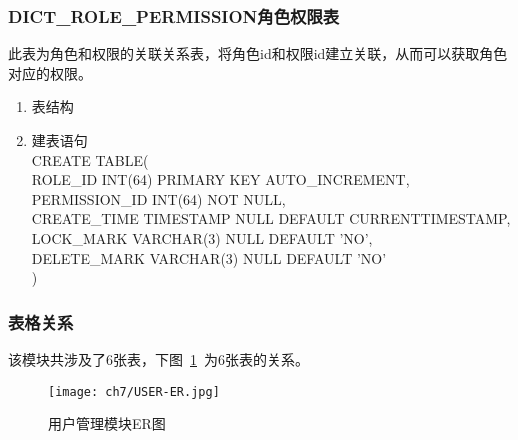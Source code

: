 \subsubsection{DICT\_ROLE\_PERMISSION角色权限表}
此表为角色和权限的关联关系表，将角色id和权限id建立关联，从而可以获取角色对应的权限。
\begin{enumerate}
    \item 表结构
    \begin{table}[htbp]
        \centering
        \end{table}
    \item 建表语句\\
        CREATE TABLE(\\
            ROLE\_ID INT(64) PRIMARY KEY AUTO\_INCREMENT,\\
            PERMISSION\_ID INT(64) NOT NULL, \\
            CREATE\_TIME TIMESTAMP NULL DEFAULT CURRENTTIMESTAMP,\\
            LOCK\_MARK VARCHAR(3) NULL DEFAULT 'NO', \\            
            DELETE\_MARK VARCHAR(3) NULL DEFAULT 'NO'\\
        )
    \end{enumerate}

\subsubsection{表格关系}
该模块共涉及了6张表，下图~\ref{fig:USER-ER}~为6张表的关系。
\begin{figure}[htbp]
    \centering
    \texttt{[image: ch7/USER-ER.jpg]}
    \caption{用户管理模块ER图}\label{fig:USER-ER}
    \vspace{\baselineskip} %
\end{figure}

